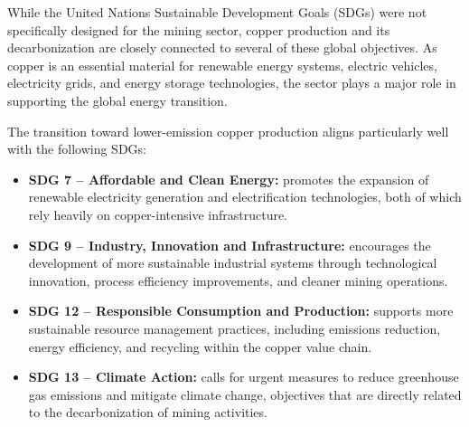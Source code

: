 While the United Nations Sustainable Development Goals (SDGs) were not specifically designed for the mining sector, copper production and its decarbonization are closely connected to several of these global objectives. As copper is an essential material for renewable energy systems, electric vehicles, electricity grids, and energy storage technologies, the sector plays a major role in supporting the global energy transition.

The transition toward lower-emission copper production aligns particularly well with the following SDGs:

\begin{itemize}
    \item \textbf{SDG 7 -- Affordable and Clean Energy:} promotes the expansion of renewable electricity generation and electrification technologies, both of which rely heavily on copper-intensive infrastructure.

    \item \textbf{SDG 9 -- Industry, Innovation and Infrastructure:} encourages the development of more sustainable industrial systems through technological innovation, process efficiency improvements, and cleaner mining operations.

    \item \textbf{SDG 12 -- Responsible Consumption and Production:} supports more sustainable resource management practices, including emissions reduction, energy efficiency, and recycling within the copper value chain.

    \item \textbf{SDG 13 -- Climate Action:} calls for urgent measures to reduce greenhouse gas emissions and mitigate climate change, objectives that are directly related to the decarbonization of mining activities.
\end{itemize}